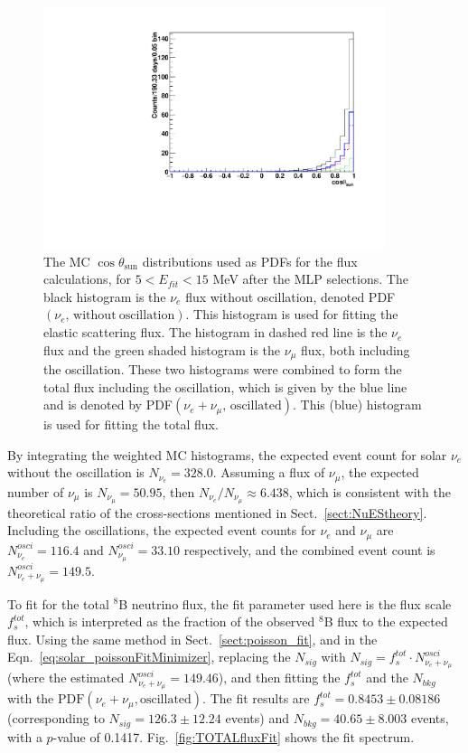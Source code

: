 \begin{figure}[!htb]
	\centering
	\includegraphics[width=10cm]{MCfluxPdfs.pdf}
	\caption[The MC $\cos\theta_\mathrm{sun}$ distributions used as PDFs for the flux calculations after the MLP selections ($5<E_{fit}<15$ MeV).]{The MC $\cos\theta_\mathrm{sun}$ distributions used as PDFs for the flux calculations, for $5<E_{fit}<15$ MeV after the MLP selections. The black histogram is the $\nu_e$ flux without oscillation, denoted PDF$(\nu_e, \, \mathrm{without~oscillation})$. This histogram is used for fitting the elastic scattering flux. The histogram in dashed red line is the $\nu_e$ flux and the green shaded histogram is the $\nu_\mu$ flux, both including the oscillation. These two histograms were combined to form the total flux including the oscillation, which is given by the blue line and is denoted by PDF$(\nu_e+\nu_\mu, \, \mathrm{oscillated})$. This (blue) histogram is used for fitting the total flux.\label{fig:MCfluxPdfs}}
\end{figure} 

By integrating the weighted MC histograms, the expected event count for solar $\nu_e$ without the oscillation is $N_{\nu_e} = 328.0$. Assuming a flux of $\nu_\mu$, the expected number of $\nu_\mu$ is $N_{\nu_\mu}=50.95$, then $N_{\nu_e}/N_{\nu_\mu}\approx 6.438$, which is consistent with the theoretical ratio of the cross-sections mentioned in Sect.~\ref{sect:NuEStheory}. Including the oscillations, the expected event counts for $\nu_e$ and $\nu_\mu$ are $N^{osci}_{\nu_e} =116.4$ and $N^{osci}_{\nu_\mu} = 33.10$ respectively, and the combined event count is $N^{osci}_{\nu_e+\nu_\mu}=149.5$.
 
To fit for the total $^8$B neutrino flux, the fit parameter used here is the flux scale $f^{tot}_s$, which is interpreted as the fraction of the observed $^8$B flux to the expected flux. Using the same method in Sect.~\ref{sect:poisson_fit}, and in the Eqn.~\ref{eq:solar_poissonFitMinimizer}, replacing the $N_{sig}$ with $N_{sig}=f^{tot}_s\cdot N^{osci}_{\nu_e+\nu_\mu}$(where the estimated $N^{osci}_{\nu_e+\nu_\mu}=149.46$), and then fitting the $f^{tot}_s$ and the $N_{bkg}$ with the $\mathrm{PDF}(\nu_e+\nu_\mu,\mathrm{oscillated})$. The fit results are $f^{tot}_s=0.8453\pm 0.08186$ (corresponding to $N_{sig}=126.3\pm 12.24$ events) and $N_{bkg}=40.65\pm8.003$ events, with a $p$-value of 0.1417. Fig.~\ref{fig:TOTALfluxFit} shows the fit spectrum.

